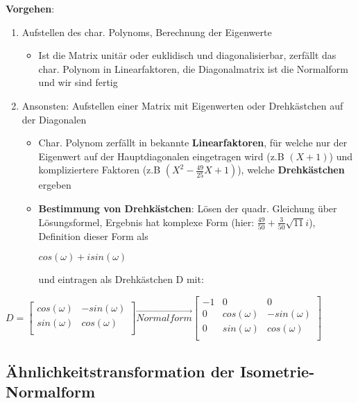 \documentclass[10pt,a4paper]{article}
\begin{document}
	\textbf{Vorgehen}:
	\begin{enumerate}
		\item Aufstellen des char. Polynoms, Berechnung der Eigenwerte
		\begin{itemize}
			\item Ist die Matrix unitär oder euklidisch und diagonalisierbar, zerfällt das char. Polynom in Linearfaktoren, die Diagonalmatrix ist die Normalform und wir sind fertig
		\end{itemize}
		\item Ansonsten: Aufstellen einer Matrix mit Eigenwerten oder Drehkästchen auf der Diagonalen
		\begin{itemize}
			\item Char. Polynom zerfällt in bekannte \textbf{Linearfaktoren}, für welche nur der Eigenwert auf der Hauptdiagonalen eingetragen wird (z.B $(X + 1)$) und kompliziertere Faktoren (z.B $(X^2 - \frac{49}{25}X + 1)$), welche \textbf{Drehkästchen} ergeben
			\item \textbf{Bestimmung von Drehkästchen}: Lösen der quadr. Gleichung über Lösungsformel, Ergebnis hat komplexe Form (hier: $\frac{49}{50} + \frac{3}{50}\sqrt{11}i$), Definition dieser Form als
			\begin{center}
				$cos(\omega) + isin(\omega)$
			\end{center}
			und eintragen als Drehkästchen D mit:
		\end{itemize}
	\end{enumerate}
		\begin{center}
		$D = \begin{bmatrix}
			cos(\omega) & -sin(\omega)\\
			sin(\omega) & cos(\omega)\\
		\end{bmatrix}
	\overrightarrow{Normalform}
		\begin{bmatrix}
			-1 & 0 & 0 \\
			0 & cos(\omega) & -sin(\omega)\\
			0 & sin(\omega) & cos(\omega)\\
		\end{bmatrix}$
	\end{center}
	
	\subsection{Ähnlichkeitstransformation der Isometrie-Normalform}
	\label{os:sub:aehnlichkeitstransformation_der_isometrie_normalform}
	
\end{document}
